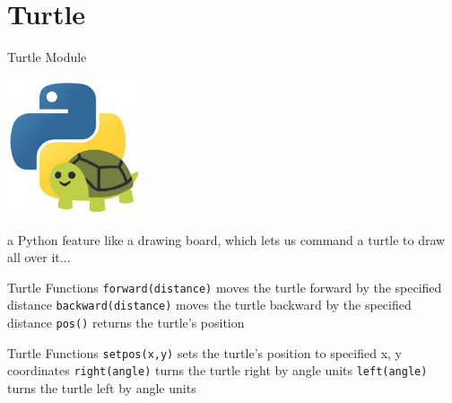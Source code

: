     \section{Turtle}
        \begin{frame}{Turtle Module}
                \begin{center}
                    \includegraphics[width=0.3\textwidth]{images/turtle.jpg}                
                \end{center}
                \pause
                \LARGE
                a Python feature like a drawing board, which lets us command a turtle to draw all over it$\dots$\\
            \end{frame}
        \begin{frame}{Turtle Functions}
            \pause
            \LARGE
            \texttt{forward(distance)} \newline
            moves the turtle forward by the specified distance \newline
            \newline
            \pause
             \texttt{backward(distance)} \newline
             moves the turtle backward by the specified distance\newline\newline
            \pause
            \texttt{pos()} \newline returns the turtle's position\newline\newline
           
            
            
            \bigskip
            \end{frame}
        \begin{frame}{Turtle Functions}
            \LARGE
            \texttt{setpos(x,y)} \newline
            sets the turtle's position to specified x, y coordinates\newline \newline
            \pause 
            \texttt{right(angle)} \newline  
            turns the turtle right by angle units\newline\newline
            \pause
            \texttt{left(angle)} \newline  
            turns the turtle left by angle units\newline\newline
           
            \bigskip
            \end{frame}
